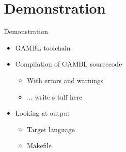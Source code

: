 \section{Demonstration} %
\label{sec:demonstration}
\begin{frame}{Demonstration}
    \begin{itemize}
        \item GAMBL toolchain
        \item Compilation of GAMBL sourcecode
        \begin{itemize}
            \item With errors and warnings
            \item ... write s   tuff here
        \end{itemize}
        \item Looking at output
        \begin{itemize}
            \item Target language
            \item Makefile
        \end{itemize}
    \end{itemize}
\end{frame}

